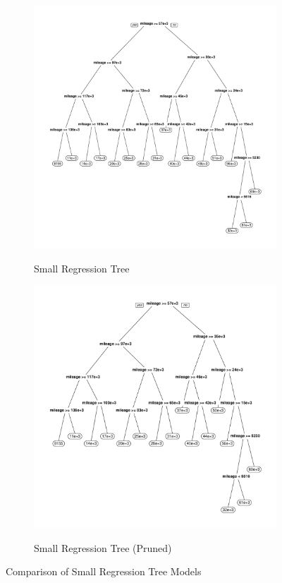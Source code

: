 \documentclass[11pt, fleqn]{article}
\begin{document}
\begin{figure}
  \centering
  \begin{subfigure}[b]{0.49\textwidth}
 \caption{Small Regression Tree}
 \includegraphics[width=\textwidth]{tree_small.pdf}
 \label{fig:tree_small}
  \end{subfigure}
  \hfill
  \begin{subfigure}[b]{0.49\textwidth}
 \caption{Small Regression Tree (Pruned)}
 \includegraphics[width=\textwidth]{tree_small_prune.pdf}
 \label{fig:tree_small_prune}
  \end{subfigure}
 \caption{Comparison of Small Regression Tree Models}
\end{figure}
\end{document}
